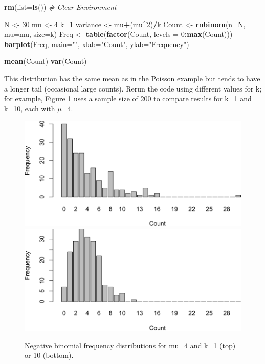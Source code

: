 \documentclass[
]{krantz}
\makeatletter
\newenvironment{Shaded}{\begin{snugshade}}{\end{snugshade}}
\newcommand{\AttributeTok}[1]{\textcolor[rgb]{0.27,0.27,0.27}{#1}}
\newcommand{\CommentTok}[1]{\textcolor[rgb]{0.37,0.37,0.37}{\textit{#1}}}
\newcommand{\DecValTok}[1]{\textcolor[rgb]{0.06,0.06,0.06}{#1}}
\newcommand{\FunctionTok}[1]{\textcolor[rgb]{0.27,0.27,0.27}{\textbf{#1}}}
\newcommand{\NormalTok}[1]{#1}
\newcommand{\OtherTok}[1]{\textcolor[rgb]{0.37,0.37,0.37}{#1}}
\newcommand{\SpecialCharTok}[1]{\textcolor[rgb]{0.43,0.43,0.43}{\textbf{#1}}}
\newcommand{\StringTok}[1]{\textcolor[rgb]{0.5,0.5,0.5}{#1}}
\newenvironment{kframe}{%
\medskip{}
\setlength{\fboxsep}{.8em}
 \def\at@end@of@kframe{}%
 \ifinner\ifhmode%
  \def\at@end@of@kframe{\end{minipage}}%
  \begin{minipage}{\columnwidth}%
 \fi\fi%
 \def\FrameCommand##1{\hskip\@totalleftmargin \hskip-\fboxsep
 \colorbox{shadecolor}{##1}\hskip-\fboxsep
     \hskip-\linewidth \hskip-\@totalleftmargin \hskip\columnwidth}%
 \MakeFramed {\advance\hsize-\width
   \@totalleftmargin\z@ \linewidth\hsize
   \@setminipage}}%
 {\par\unskip\endMakeFramed%
 \at@end@of@kframe}
\renewenvironment{Shaded}{\begin{kframe}}{\end{kframe}}
\makeatother
\begin{document}
\begin{Shaded}
\begin{Highlighting}[]
\FunctionTok{rm}\NormalTok{(}\AttributeTok{list=}\FunctionTok{ls}\NormalTok{()) }\CommentTok{\# Clear Environment}

\NormalTok{N }\OtherTok{\textless{}{-}} \DecValTok{30}
\NormalTok{mu }\OtherTok{\textless{}{-}} \DecValTok{4}
\NormalTok{k}\OtherTok{=}\DecValTok{1}
\NormalTok{variance }\OtherTok{\textless{}{-}}\NormalTok{ mu}\SpecialCharTok{+}\NormalTok{(mu}\SpecialCharTok{\^{}}\DecValTok{2}\NormalTok{)}\SpecialCharTok{/}\NormalTok{k}
\NormalTok{Count }\OtherTok{\textless{}{-}} \FunctionTok{rnbinom}\NormalTok{(}\AttributeTok{n=}\NormalTok{N, }\AttributeTok{mu=}\NormalTok{mu, }\AttributeTok{size=}\NormalTok{k)}
\NormalTok{Freq }\OtherTok{\textless{}{-}} \FunctionTok{table}\NormalTok{(}\FunctionTok{factor}\NormalTok{(Count, }\AttributeTok{levels =} \DecValTok{0}\SpecialCharTok{:}\FunctionTok{max}\NormalTok{(Count)))}
\FunctionTok{barplot}\NormalTok{(Freq, }\AttributeTok{main=}\StringTok{""}\NormalTok{, }\AttributeTok{xlab=}\StringTok{"Count"}\NormalTok{, }\AttributeTok{ylab=}\StringTok{"Frequency"}\NormalTok{)}

\FunctionTok{mean}\NormalTok{(Count)}
\FunctionTok{var}\NormalTok{(Count)}
\end{Highlighting}
\end{Shaded}

This distribution has the same mean as in the Poisson example but tends to have a longer tail (occasional large counts). Rerun the code using different values for k; for example, Figure \ref{fig:NB-vary-k} uses a sample size of 200 to compare results for k=1 and k=10, each with \(\mu\)=4.

\begin{figure}
\includegraphics[width=0.9\linewidth]{bookdown_files/figure-latex/NB-vary-k-1} \includegraphics[width=0.9\linewidth]{bookdown_files/figure-latex/NB-vary-k-2} \caption{Negative binomial frequency distributions for mu=4 and k=1 (top) or 10 (bottom).}\label{fig:NB-vary-k}
\end{figure}
\end{document}
